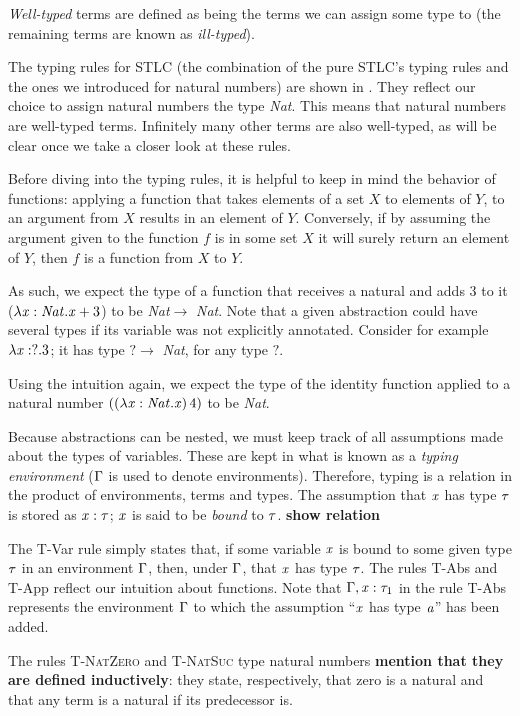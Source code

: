 \textit{Well-typed} terms are defined as being the terms we can assign some type to (the remaining terms are known as \textit{ill-typed}).

The typing rules for STLC (the combination of the pure STLC's typing rules and the ones we introduced for natural numbers) are shown in . They reflect our choice to assign natural numbers the type \textit{Nat}. This means that natural numbers are well-typed terms. Infinitely many other terms are also well-typed, as will be clear once we take a closer look at these rules.

Before diving into the typing rules, it is helpful to keep in mind the behavior of functions: applying a function that takes elements of a set $X$ to elements of $Y$, to an argument from $X$ results in an element of $Y$. Conversely, if by assuming the argument given to the function $f$ is in some set $X$ it will surely return an element of $Y$, then $f$ is a function from $X$ to $Y$.

As such, we expect the type of a function that receives a natural and adds $3$ to it ($\lambda \mathit{x}:\mathit{Nat}.\mathit{x}+3$) to be \textit{Nat}$ \rightarrow$ \textit{Nat}. Note that a given abstraction could have several types if its variable was not explicitly annotated. Consider for example $\lambda \mathit{x}:?.3$; it has type $? \to$ \textit{Nat}, for any type $?$.

Using the intuition again, we expect the type of the identity function applied to a natural number $((\lambda \mathit{x}: \mathit{Nat}. \mathit{x}) \, 4)$ to be \textit{Nat}. 

Because abstractions can be nested, we must keep track of all assumptions made about the types of variables. These are kept in what is known as a \textit{typing  environment} ($\Gamma$ is used to denote environments). Therefore, typing is a relation in the product of environments, terms and types. The assumption that $\mathit{x}$ has type $\mathit{\tau}$ is stored as $\mathit{x}:\mathit{\tau}$; $\mathit{x}$ is said to be \textit{bound} to $\mathit{\tau}$. \textbf{show relation}

The T-Var rule simply states that, if some variable $\mathit{x}$ is bound to some given type $\mathit{\tau}$ in an environment $\Gamma$, then, under $\Gamma$, that $\mathit{x}$ has type $\mathit{\tau}$. The rules T-Abs and T-App reflect our intuition about functions. Note that $\Gamma,\mathit{x}:\mathit{\tau}_1$ in the rule T-Abs represents the environment $\Gamma$ to which the assumption ``$\mathit{x}$ has type $\mathit{a}$'' has been added.

The rules \textsc{T-NatZero} and \textsc{T-NatSuc} type natural numbers \textbf{mention that they are defined inductively}: they state, respectively, that zero is a natural and that any term is a natural if its predecessor is.

